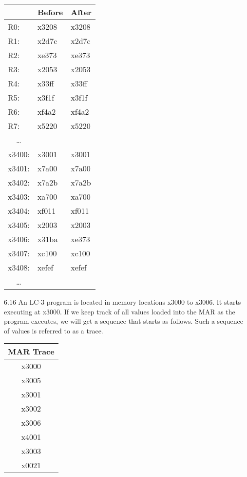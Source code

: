 \documentclass{patt}
\begin{document}
\begin{exercises}
\begin{inlinetable}
{\fontsize{9}{13}\selectfont
\begin{tabular}{|l|l|l|}
\hline
\rule{0pt}{10pt}&Before &After\\
\hline
\rule{0pt}{10pt}R0:\rule{0pt}{10pt}
& x3208 & x3208\\
R1: & x2d7c & x2d7c\\
R2: & xe373 & xe373\\
R3: & x2053 & x2053\\
R4: & x33ff & x33ff\\
R5: & x3f1f & x3f1f\\
R6: & xf4a2 & xf4a2\\
R7: & x5220 & x5220\\\hline
\multicolumn{1}{|c|}{\ldots\rule{0pt}{10pt}} & & \\
x3400: & x3001 & x3001\\
x3401: & x7a00 & x7a00\\
x3402: & x7a2b & x7a2b\\
x3403: & xa700 & xa700\\
x3404: & xf011 & xf011\\
x3405: & x2003 & x2003\\
x3406: & x31ba & xe373\\
x3407: & xc100 & xc100 \\
x3408: & xefef & xefef\\
\multicolumn{1}{|c|}{\ldots\rule{0pt}{10pt}} & & \\
\hline
\end{tabular}}
\end{inlinetable}\vspace{1.5pc}

\item[6.16] An LC-3 program is located in memory locations x3000 to
  x3006. It starts executing at x3000. If we keep track of all values
  loaded into the MAR as the program executes, we will get a sequence
  that starts as follows. Such a sequence of values is referred to as
  a trace.
\vspace{-0.2in}
\begin{inlinetable}
{\fontsize{9}{13}\selectfont
\begin{tabular}{@{}c@{}}
MAR Trace\\
\hline
\rule{0pt}{10pt}x3000\rule{0pt}{10pt}\\
 x3005\\
 x3001 \\
x3002\\
 x3006\\
 x4001\\
 x3003\\
 x0021
\end{tabular}}
\end{inlinetable}


\end{exercises}
\end{document}
